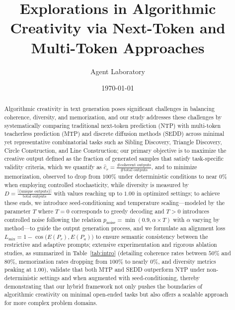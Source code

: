 \documentclass{article} %
\title{Explorations in Algorithmic Creativity via Next-Token and Multi-Token Approaches}
\author{Agent Laboratory}
\date{\today}
\begin{document}
\maketitle

\begin{abstract}
Algorithmic creativity in text generation poses significant challenges in balancing coherence, diversity, and memorization, and our study addresses these challenges by systematically comparing traditional next-token prediction (NTP) with multi-token teacherless prediction (MTP) and discrete diffusion methods (SEDD) across minimal yet representative combinatorial tasks such as Sibling Discovery, Triangle Discovery, Circle Construction, and Line Construction; our primary objective is to maximize the creative output defined as the fraction of generated samples that satisfy task-specific validity criteria, which we quantify as \(\hat{c}_r = \frac{\# \text{coherent outputs}}{\# \text{total outputs}}\), and to minimize memorization, observed to drop from \(100\%\) under deterministic conditions to near \(0\%\) when employing controlled stochasticity, while diversity is measured by \(D = \frac{|\{ \text{unique outputs} \}|}{\text{total outputs}}\) with values reaching up to \(1.00\) in optimized settings; to achieve these ends, we introduce seed-conditioning and temperature scaling—modeled by the parameter \(T\) where \(T=0\) corresponds to greedy decoding and \(T>0\) introduces controlled noise following the relation \(p_{\text{noise}} = \min(0.9, \alpha \times T)\) with \(\alpha\) varying by method—to guide the output generation process, and we formulate an alignment loss \(L_{\text{mix}} = 1 - \cos\Big(E(P_r), E(P_a)\Big)\) to ensure semantic consistency between the restrictive and adaptive prompts; extensive experimentation and rigorous ablation studies, as summarized in Table~\ref{tab:intro} (detailing coherence rates between \(50\%\) and \(80\%\), memorization rates dropping from \(100\%\) to nearly \(0\%\), and diversity metrics peaking at \(1.00\)), validate that both MTP and SEDD outperform NTP under non-deterministic settings and when augmented with seed-conditioning, thereby demonstrating that our hybrid framework not only pushes the boundaries of algorithmic creativity on minimal open-ended tasks but also offers a scalable approach for more complex problem domains.
\end{abstract}
\end{document}
